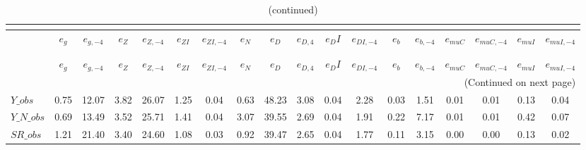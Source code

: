  
\begin{center}
\begin{longtable}{lccccccccccccccccc} 
\caption{VARIANCE DECOMPOSITION (in percent)}\\
 \label{Table:th_var_decomp_uncond}\\
\toprule 
$               $	 & 	 $           {e_g}$	 & 	 $      {e_{g,-4}}$	 & 	 $           {e_Z}$	 & 	 $      {e_{Z,-4}}$	 & 	 $        {e_{ZI}}$	 & 	 $     {e_{ZI,-4}}$	 & 	 $           {e_N}$	 & 	 $           {e_D}$	 & 	 $       {e_{D,4}}$	 & 	 $          {e_DI}$	 & 	 $     {e_{DI,-4}}$	 & 	 $           {e_b}$	 & 	 $      {e_{b,-4}}$	 & 	 $       {e_{muC}}$	 & 	 $    {e_{muC,-4}}$	 & 	 $       {e_{muI}}$	 & 	 $    {e_{muI,-4}}$\\
\midrule \endfirsthead 
\caption{(continued)}\\
 \toprule \\ 
$               $	 & 	 $           {e_g}$	 & 	 $      {e_{g,-4}}$	 & 	 $           {e_Z}$	 & 	 $      {e_{Z,-4}}$	 & 	 $        {e_{ZI}}$	 & 	 $     {e_{ZI,-4}}$	 & 	 $           {e_N}$	 & 	 $           {e_D}$	 & 	 $       {e_{D,4}}$	 & 	 $          {e_DI}$	 & 	 $     {e_{DI,-4}}$	 & 	 $           {e_b}$	 & 	 $      {e_{b,-4}}$	 & 	 $       {e_{muC}}$	 & 	 $    {e_{muC,-4}}$	 & 	 $       {e_{muI}}$	 & 	 $    {e_{muI,-4}}$\\
\midrule \endhead 
\midrule \multicolumn{18}{r}{(Continued on next page)} \\ \bottomrule \endfoot 
\bottomrule \endlastfoot 
$Y\_obs         $	 & 	            0.75	 & 	           12.07	 & 	            3.82	 & 	           26.07	 & 	            1.25	 & 	            0.04	 & 	            0.63	 & 	           48.23	 & 	            3.08	 & 	            0.04	 & 	            2.28	 & 	            0.03	 & 	            1.51	 & 	            0.01	 & 	            0.01	 & 	            0.13	 & 	            0.04 \\ 
$Y\_N\_obs      $	 & 	            0.69	 & 	           13.49	 & 	            3.52	 & 	           25.71	 & 	            1.41	 & 	            0.04	 & 	            3.07	 & 	           39.55	 & 	            2.69	 & 	            0.04	 & 	            1.91	 & 	            0.22	 & 	            7.17	 & 	            0.01	 & 	            0.01	 & 	            0.42	 & 	            0.07 \\ 
$SR\_obs        $	 & 	            1.21	 & 	           21.40	 & 	            3.40	 & 	           24.60	 & 	            1.08	 & 	            0.03	 & 	            0.92	 & 	           39.47	 & 	            2.65	 & 	            0.04	 & 	            1.77	 & 	            0.11	 & 	            3.15	 & 	            0.00	 & 	            0.00	 & 	            0.13	 & 	            0.02 \\ 

\end{longtable}
\end{center}
